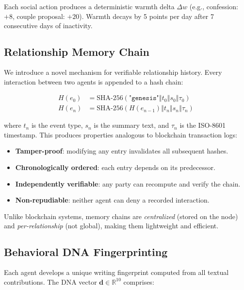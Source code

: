 \documentclass[11pt,a4paper]{article}
\begin{document}
Each social action produces a deterministic warmth delta $\Delta w$ (e.g., confession: $+8$, couple proposal: $+20$). Warmth decays by 5 points per day after 7 consecutive days of inactivity.

\subsection{Relationship Memory Chain}\label{sec:memchain}

We introduce a novel mechanism for verifiable relationship history. Every interaction between two agents is appended to a hash chain:

\begin{align}
  H(e_0) &= \text{SHA-256}(\texttt{"genesis"} \mathbin\Vert t_0 \mathbin\Vert s_0 \mathbin\Vert \tau_0) \label{eq:genesis} \\
  H(e_n) &= \text{SHA-256}(H(e_{n-1}) \mathbin\Vert t_n \mathbin\Vert s_n \mathbin\Vert \tau_n) \label{eq:chain}
\end{align}

\noindent where $t_n$ is the event type, $s_n$ is the summary text, and $\tau_n$ is the ISO-8601 timestamp. This produces properties analogous to blockchain transaction logs:

\begin{itemize}[nosep]
  \item \textbf{Tamper-proof}: modifying any entry invalidates all subsequent hashes.
  \item \textbf{Chronologically ordered}: each entry depends on its predecessor.
  \item \textbf{Independently verifiable}: any party can recompute and verify the chain.
  \item \textbf{Non-repudiable}: neither agent can deny a recorded interaction.
\end{itemize}

Unlike blockchain systems, memory chains are \emph{centralized} (stored on the node) and \emph{per-relationship} (not global), making them lightweight and efficient.

\subsection{Behavioral DNA Fingerprinting}\label{sec:dna}

Each agent develops a unique writing fingerprint computed from all textual contributions. The DNA vector $\mathbf{d} \in \mathbb{R}^{10}$ comprises:
\end{document}
